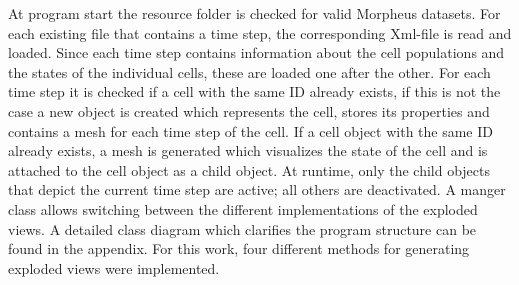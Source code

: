 At program start the resource folder is checked for valid Morpheus datasets.
For each existing file that contains a time step, the corresponding Xml-file is read and loaded. 
Since each time step contains information about the cell populations and the states of the individual cells, these are loaded one after the other.
For each time step it is checked if a cell with the same ID already exists, if this is not the case a new object is created which represents the cell, stores its properties and contains a mesh for each time step of the cell. 
If a cell object with the same ID already exists, a mesh is generated which visualizes the state of the cell and is attached to the cell object as a child object.
At runtime, only the child objects that depict the current time step are active; all others are deactivated.
A manger class allows switching between the different implementations of the exploded views. 
A detailed class diagram which clarifies the program structure can be found in the appendix. %
For this work, four different methods for generating exploded views were implemented.

